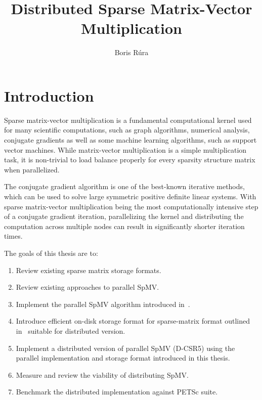 \documentclass[thesis=M,english]{FITthesis}[2019/12/23]
\title{Distributed Sparse Matrix-Vector Multiplication}
\author{Boris Rúra} %
\begin{document}
\tableofcontents

\chapter{Introduction}

Sparse matrix-vector multiplication is a fundamental computational kernel used for many
scientific computations, such as graph algorithms, numerical analysis, conjugate gradients
as well as some machine learning algorithms, such as support vector machines.
While matrix-vector multiplication is a simple multiplication task, it is non-trivial to load balance
properly for every sparsity structure matrix when parallelized.

The conjugate gradient algorithm is one of the best-known iterative methods, which can be used to solve large
symmetric positive definite linear systems. With sparse matrix-vector multiplication being the most
computationally intensive step of a conjugate gradient iteration, parallelizing the kernel and distributing
the computation across multiple nodes can result in significantly shorter iteration times.

The goals of this thesis are to:

\begin{enumerate}
    \item Review existing sparse matrix storage formats.
    \item Review existing approaches to parallel SpMV\@.
    \item Implement the parallel SpMV algorithm introduced in~\cite{liu2015csr5}.
    \item Introduce efficient on-disk storage format for sparse-matrix format outlined
          in~\cite{liu2015csr5} suitable for distributed version.
    \item Implement a distributed version of parallel SpMV (D-CSR5) using the parallel implementation
          and storage format introduced in this thesis.
    \item Measure and review the viability of distributing SpMV\@.
    \item Benchmark the distributed implementation against PETSc suite.
\end{enumerate}



\end{document}
